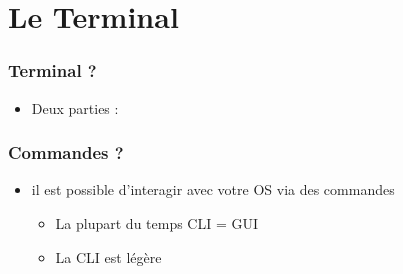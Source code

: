 \section{Le Terminal} 
\begin{frame}
        \frametitle{Terminal ?}
	\begin{itemize}
	    \item Deux parties :
	\end{itemize}
\end{frame}
\begin{frame}
    \frametitle{Commandes ?}
    \begin{itemize}
        \item il est possible d'interagir avec votre OS via des commandes
            \begin{itemize}
                \item La plupart du temps CLI = GUI
                \item La CLI est légère
            \end{itemize}
    \end{itemize}
\end{frame}
